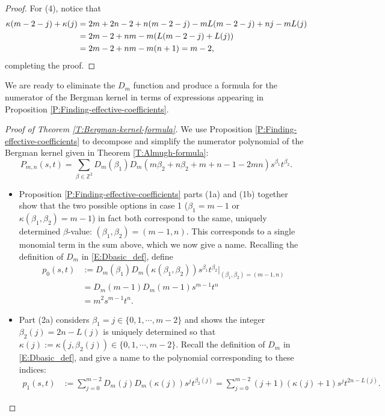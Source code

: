 \documentclass[letterpaper,11pt,reqno]{amsart}
\theoremstyle{plain}
\theoremstyle{definition}
\theoremstyle{remark}
\theoremstyle{remark}
\numberwithin{equation}{section}
\newcommand{\Z}{{\mathbb Z}}
\begin{document}
\begin{proof}
For (4), notice that
\begin{align}
\kappa(m-2-j) + \kappa(j) &= 2m + 2n - 2 + n(m-2-j) - m L(m-2-j) + nj - mL(j) \notag \\
&= 2m - 2 + nm - m(L(m-2-j) + L(j)) \notag \\ 
&= 2m - 2 + nm  - m(n+1) \label{E:int-step1-sum-of-Ls} = m-2,
\end{align}
completing the proof.
\end{proof}

We are ready to eliminate the $D_m$ function and produce a formula for the numerator of the Bergman kernel in terms of expressions appearing in Proposition \ref{P:Finding-effective-coefficients}.

\begin{proof}[Proof of Theorem \ref{T:Bergman-kernel-formula}]
We use Proposition \ref{P:Finding-effective-coefficients} to decompose and simplify the numerator polynomial of the Bergman kernel given in Theorem \ref{T:Almugh-formula}:
\begin{equation*}
P_{m,n}(s,t) = \sum_{\beta\in \Z^2} D_m(\beta_1) D_m(m\beta_2+n\beta_2 + m + n -1 -2mn) s^{\beta_1} t^{\beta_2}.
\end{equation*}

\begin{itemize}[wide]
    
\item Proposition \ref{P:Finding-effective-coefficients} parts (1a) and (1b) together show that the two possible options in case 1 ($\beta_1 = m-1$ or $\kappa(\beta_1,\beta_2) = m-1$) in fact both correspond to the same, uniquely determined $\beta$-value: $(\beta_1,\beta_2) = (m-1,n)$.
This corresponds to a single monomial term in the sum above, which we now give a name.
Recalling the definition of $D_m$ in \eqref{E:Dbasic_def}, define
\begin{align*}
p_0(s,t) &:= D_m(\beta_1) D_m( \kappa(\beta_1,\beta_2) ) s^{\beta_1} t^{\beta_2} 
\Big|_{(\beta_1,\beta_2) = (m-1,n)} \\
&=D_m(m-1) D_m(m-1) s^{m-1} t^n \\
&= m^2 s^{m-1} t^n.
\end{align*}

\item Part (2a) considers $\beta_1 = j \in \{0,1,\cdots,m-2 \}$ and shows the integer $\beta_2(j) = 2n - L(j)$ is uniquely determined so that $\kappa(j) := \kappa(j,\beta_2(j)) \in \{0,1,\cdots,m-2 \}$. 
Recall the definition of $D_m$ in \eqref{E:Dbasic_def}, and give a name to the polynomial corresponding to these indices:
\begin{align*}
p_1(s,t) 
&:= \sum_{j=0}^{m-2} D_m(j) D_m(\kappa(j)) s^j t^{\beta_2(j)} = \sum_{j=0}^{m-2} (j+1) (\kappa(j)+1) s^j t^{2n-L(j)}.
\end{align*}


\end{itemize}
\end{proof}
\end{document}
